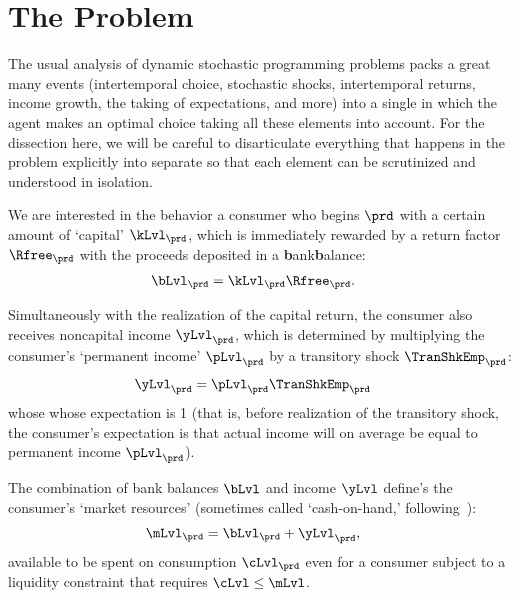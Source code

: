 
\hypertarget{the-problem}{}
\section{The Problem}\label{sec:the-problem}

The usual analysis of dynamic stochastic programming problems packs a great many events (intertemporal choice, stochastic shocks, intertemporal returns, income growth, the taking of expectations, and more) into a single {\move} in which the agent makes an optimal choice taking all these elements into account. For the dissection here, we will be careful to disarticulate everything that happens in the problem explicitly into separate {\moves} so that each element can be scrutinized and understood in isolation.

We are interested in the behavior a consumer who begins {\interval} $\prd$ with a certain amount of `capital' $\kLvl_{\prd}$, which is immediately rewarded by a return factor $\Rfree_{\prd}$  with the proceeds deposited in a \textbf{b}ank\textbf{b}alance:
\begin{equation}\begin{gathered}\begin{aligned}\label{eq:bLvl}
      \bLvl_{\prd} & = \kLvl_{\prd}\Rfree_{\prd}. 
    \end{aligned}\end{gathered}\end{equation}

Simultaneously with the realization of the capital return, the consumer also receives noncapital income $\yLvl_{\prd}$, which is determined by multiplying the consumer's `permanent income' $\pLvl_{\prd}$ by a transitory shock $\TranShkEmp_{\prd}$:
\begin{equation}\begin{gathered}\begin{aligned}
      \yLvl_{\prd} & = \pLvl_{\prd}\TranShkEmp_{\prd} \label{eq:yLvl}
    \end{aligned}\end{gathered}\end{equation}
whose whose expectation is 1 (that is, before realization of the transitory shock, the consumer's expectation is that actual income will on average be equal to permanent income $\pLvl_{\prd}$).

The combination of bank balances $\bLvl$ and income $\yLvl$ define's the consumer's `market resources' (sometimes called `cash-on-hand,' following~\cite{deatonUnderstandingC}):
\begin{equation}\begin{gathered}\begin{aligned}
      \mLvl_{\prd} & = \bLvl_{\prd}+\yLvl_{\prd} \label{eq:mLvl},
    \end{aligned}\end{gathered}\end{equation}
available to be spent on consumption $\cLvl_{\prd}$ even for a consumer subject to a liquidity constraint that requires $\cLvl \leq \mLvl$.

